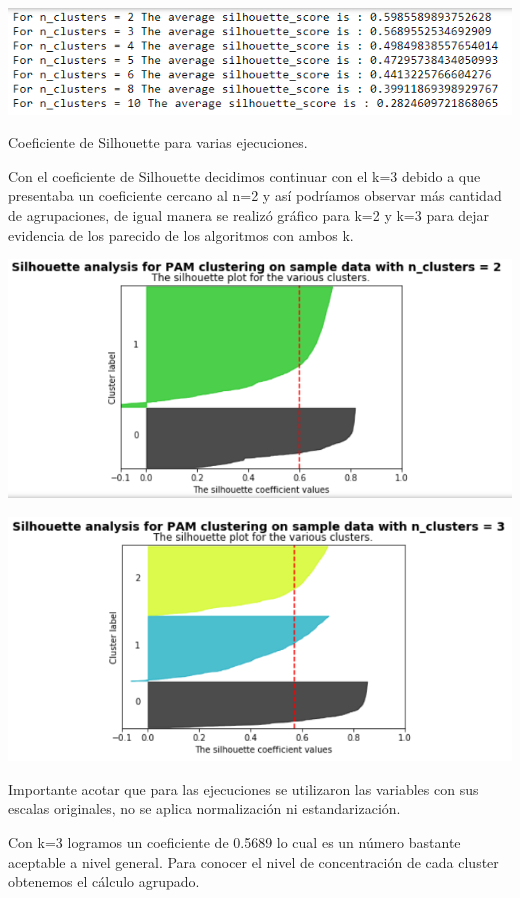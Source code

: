 \documentclass{icisfinal}
\begin{document}
\includegraphics[width=\textwidth]{img/imagenes/1PAM_silohuete}
\begin{center}Coeficiente de Silhouette para varias ejecuciones.\end{center}

Con el coeficiente de Silhouette decidimos continuar con el k=3 debido a que presentaba un coeficiente cercano al n=2 y así podríamos observar más cantidad de agrupaciones, de igual manera se realizó gráfico para k=2 y k=3 para dejar evidencia de los parecido de los algoritmos con ambos k.

\includegraphics[width=\textwidth]{img/imagenes/3PAM_silohuete_k2}

\includegraphics[width=\textwidth]{img/imagenes/4PAM_silohuete_k3}


Importante acotar que para las ejecuciones se utilizaron las variables con sus escalas originales, no se aplica normalización ni estandarización.

Con k=3 logramos un coeficiente de 0.5689 lo cual es un número bastante aceptable a nivel general.  Para conocer el nivel de concentración de cada cluster obtenemos el cálculo agrupado.
\end{document}
